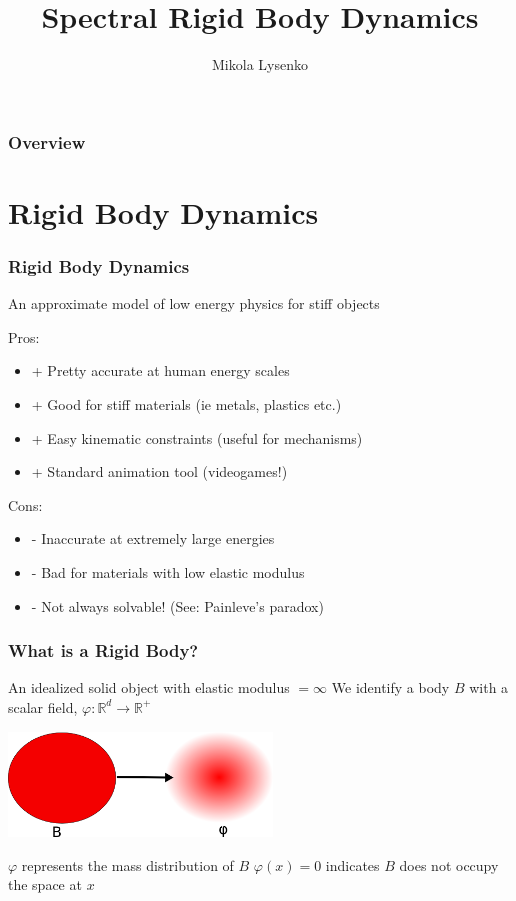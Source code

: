 \documentclass{beamer}
\title{Spectral Rigid Body Dynamics}
\author{Mikola Lysenko}
\begin{document}
\newcommand{\R}{\mathbb{R}}
\newcommand{\ind}[1]{{\bf 1}_{#1}}
\newcommand{\inner}[2]{\left \langle #1 , #2 \right \rangle}

\maketitle

\begin{frame}
	\frametitle{Overview}
		\tableofcontents
\end{frame}

\section{Rigid Body Dynamics}
\begin{frame}
\frametitle{Rigid Body Dynamics}
An approximate model of low energy physics for stiff objects

\pause
\vskip15pt
Pros:
\begin{itemize}
	\item{+} Pretty accurate at human energy scales
	\item{+} Good for stiff materials (ie metals, plastics etc.)
	\item{+} Easy kinematic constraints (useful for mechanisms)
	\item{+} Standard animation tool (videogames!)
\end{itemize}

\pause
\vskip15pt
Cons:
\begin{itemize}
	\item{-} Inaccurate at extremely large energies
	\item{-} Bad for materials with low elastic modulus
	\item{-} Not always solvable! (See: Painleve's paradox)
\end{itemize}
\end{frame}

\begin{frame}
\frametitle{What is a Rigid Body?}
An idealized solid object with elastic modulus $= \infty$
\pause
\vskip5pt
We identify a body $B$ with a scalar field, $\varphi : \R^d \to \R^+$
\vskip5pt
\begin{center}
\includegraphics[height=1.1in]{figures/massfield.png}
\end{center}
\pause
\vskip5pt
$\varphi$ represents the mass distribution of $B$
\pause
\vskip5pt
$\varphi(x) = 0$ indicates $B$ does not occupy the space at $x$
\end{frame}
\end{document}
